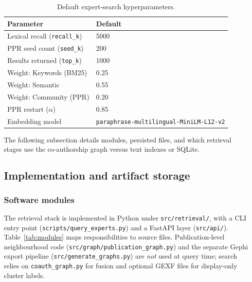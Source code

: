 \documentclass{article}
\begin{document}
\begin{table}[htbp]
  \centering
  \caption{Default expert-search hyperparameters.}
  \label{tab:search-hyperparams}
  \begin{tabular}{@{}ll@{}}
    \toprule
    Parameter & Default \\
    \midrule
    Lexical recall (\texttt{recall\_k}) & \num{5000} \\
    PPR seed count (\texttt{seed\_k}) & \num{200} \\
    Results returned (\texttt{top\_k}) & \num{1000} \\
    Weight: Keywords (BM25) & \num{0.25} \\
    Weight: Semantic & \num{0.55} \\
    Weight: Community (PPR) & \num{0.20} \\
    PPR restart ($\alpha$) & \num{0.85} \\
    Embedding model & \texttt{paraphrase-multilingual-MiniLM-L12-v2} \\
    \bottomrule
  \end{tabular}
\end{table}

The following subsection details modules, persisted files, and which retrieval stages use the co-authorship graph versus text indexes or SQLite.

\subsection{Implementation and artifact storage}

\subsubsection{Software modules}

The retrieval stack is implemented in Python under \texttt{src/retrieval/}, with a CLI entry point (\texttt{scripts/query\_experts.py}) and a FastAPI layer (\texttt{src/api/}). Table~\ref{tab:modules} maps responsibilities to source files. Publication-level neighbourhood code (\texttt{src/graph/publication\_graph.py}) and the separate Gephi export pipeline (\texttt{src/generate\_graphs.py}) are \emph{not} used at query time; search relies on \texttt{coauth\_graph.py} for fusion and optional GEXF files for display-only cluster labels.
\end{document}
